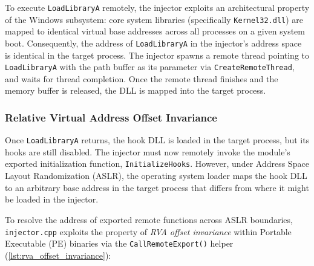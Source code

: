 To execute \texttt{LoadLibraryA} remotely, the injector exploits an architectural property of the Windows subsystem: core system libraries (specifically \texttt{Kernel32.dll}) are mapped to identical virtual base addresses across all processes on a given system boot.
Consequently, the address of \texttt{LoadLibraryA} in the injector's address space is identical in the target process.
The injector spawns a remote thread pointing to \texttt{LoadLibraryA} with the path buffer as its parameter via \texttt{CreateRemoteThread}, and waits for thread completion.
Once the remote thread finishes and the memory buffer is released, the \ac{DLL} is mapped into the target process.

\subsubsection{Relative Virtual Address Offset Invariance}

Once \texttt{LoadLibraryA} returns, the hook \ac{DLL} is loaded in the target process, but its hooks are still disabled.
The injector must now remotely invoke the module's exported initialization function, \texttt{InitializeHooks}.
However, under Address Space Layout Randomization (ASLR), the operating system loader maps the hook \ac{DLL} to an arbitrary base address in the target process that differs from where it might be loaded in the injector.

To resolve the address of exported remote functions across ASLR boundaries, \texttt{injector.cpp} exploits the property of \emph{\ac{RVA} offset invariance} within Portable Executable (PE) binaries via the \texttt{CallRemoteExport()} helper (\cref{lst:rva_offset_invariance}):

